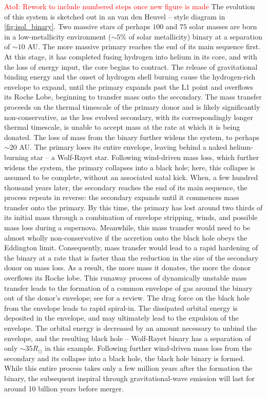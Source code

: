 \documentclass[iop,onecolumn]{revtex4}
\newcommand{\ajf}[1]{\textcolor{red}{AtoI: #1}}
\begin{document}
\ajf{Rework to include numbered steps once new figure is made}
The evolution of this system is sketched out in an van den Heuvel -- style diagram in \autoref{fig:isol_binary}.  Two massive stars of perhaps $100$ and $75$ solar masses are born in a low-metallicity environment ($\sim 5\%$ of solar metallicity)  binary at a separation of $\sim 10$ AU.  The more massive primary reaches the end of its main sequence first.  At this stage, it has completed fusing hydrogen into helium in its core, and with the loss of energy input, the core begins to contract.  The release of gravitational binding energy and the onset of hydrogen shell burning cause the hydrogen-rich envelope to expand, until the primary expands past the L1 point and overflows its Roche Lobe, beginning to transfer mass onto the secondary.  The mass transfer proceeds on the thermal timescale of the primary donor and is likely significantly non-conservative, as the less evolved secondary, with its correspondingly longer thermal timescale, is unable to accept mass at the rate at which it is being donated.  The loss of mass from the binary further widens the system, to perhaps $\sim 20$ AU.  The primary loses its entire envelope, leaving behind a naked helium-burning star -- a Wolf-Rayet star.  Following wind-driven mass loss, which further widens the system, the primary collapses into a black hole; here, this collapse is assumed to be complete, without an associated natal kick.  When, a few hundred thousand years later, the secondary reaches the end of its main sequence, the process repeats in reverse: the secondary expands until it commences mass transfer onto the primary.  By this time, the primary has lost around two thirds of its initial mass through a combination of envelope stripping, winds, and possible mass loss during a supernova.  Meanwhile, this mass transfer would need to be almost wholly non-conservative if the accretion onto the black hole obeys the Eddington limit.  Consequently, mass transfer would lead to a rapid hardening of the binary at a rate that is faster than the reduction in the size of the secondary donor on mass loss.  As a result, the more mass it donates, the more the donor overflows its Roche lobe.  This runaway process of dynamically unstable mass transfer leads to the formation of a common envelope of gas around the binary out of the donor's envelope; see \citet{Ivanova:2013} for a review.  The drag force on the black hole from the envelope leads to rapid spiral-in.   The dissipated orbital energy is deposited in the envelope, and may ultimately lead to the expulsion of the envelope.  The orbital energy is decreased by an amount necessary to unbind the envelope, and the resulting black hole -- Wolf-Rayet binary has a separation of only $\sim 35 R_\odot$ in this example.  Following further wind-driven mass loss from the secondary and its collapse into a black hole, the black hole binary is formed.  While this entire process takes only a few million years after the formation the binary, the subsequent inspiral through gravitational-wave emission will last for around 10 billion years before merger.
\end{document}
